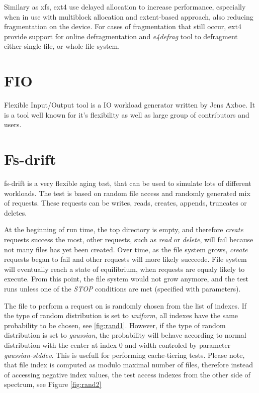 \documentclass[
  color, %
  table, %
  lof,   %
  lot,   %
]{fithesis3}
\begin{document}

Similary as xfs, ext4 use delayed allocation to increase performance, especially when in use with multiblock allocation and extent-based approach, also reducing fragmentation on the device. For cases of fragmentation that still occur, ext4 provide support for online defragmentation and \textit{e4defrag} tool to defragment either single file, or whole file system.

\section{FIO}
Flexible Input/Output tool is a IO workload generator written by Jens Axboe. It is a tool well known for it's flexibility as well as large group of contributors and users.

\section{Fs-drift}
fs-drift is a very flexible aging test, that can be used to simulate lots of different workloads. The test is based on random file access and randomly generated mix of requests. These requests can be writes, reads, creates, appends, truncates or deletes.

At the beginning of run time, the top directory is empty, and therefore \textit{create} requests success the most, other requests, such as \textit{read} or \textit{delete}, will fail because not many files has yet been created. Over time, as the file system grows, \textit{create} requests began to fail and other requests will more likely succeede. File system will eventually reach a state of equilibrium, when requests are equaly likely to execute. From this point, the file system would not grow anymore, and the test runs unless one of the \textit{STOP} conditions are met (specified with parameters).

The file to perform a request on is randomly chosen from the list of indexes. If the type of random distribution is set to \textit{uniform}, all indexes have the same probability to be chosen, see \ref{fig:rand1}. However, if the type of random distribution is set to \textit{gaussian}, the probability will behave according to normal distribution with the center at index 0 and width controled by parameter \textit{gaussian-stddev}. This is usefull for performing cache-tiering tests. Please note, that file index is computed as modulo maximal number of files, therefore instead of accessing negative index values, the test access indexes from the other side of spectrum, see Figure \ref{fig:rand2}
\end{document}
